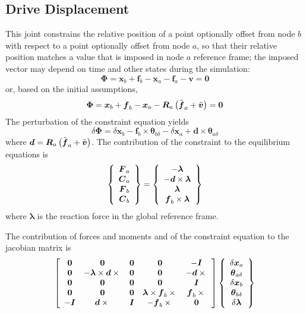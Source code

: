 \documentclass[10pt,dvips,fleqn]{report}
\newcommand{\T}[1]{\boldsymbol{#1}}
\begin{document}
\subsection{Drive Displacement}
This joint constrains the relative position of a point optionally offset 
from node $b$ with respect to a point optionally offset from node $a$, 
so that their relative position matches a value that is imposed in node $a$ 
reference frame; the imposed vector may depend on time and other states
during the simulation:
\begin{equation}
	\T{\Phi} = \T{x}_b + \T{f}_b - \T{x}_a - \T{f}_a - \T{v} = \T{0}
\end{equation}
or, based on the initial assumptions,
\begin{equation}
	\T{\Phi} = \T{x}_b + \T{f}_b - \T{x}_a
		- \T{R}_a\plbr{\tilde{\T{f}}_a + \tilde{\T{v}}} = \T{0}
\end{equation}
The perturbation of the constraint equation yields
\begin{equation}
	\delta\T{\Phi} = 
		\delta\T{x}_b
		- \T{f}_b\times\T{\theta}_{b\delta}
		- \delta\T{x}_a
		+ \T{d}\times\T{\theta}_{a\delta}
\end{equation}
where $\T{d}=\T{R}_a\plbr{\tilde{\T{f}}_a + \tilde{\T{v}}}$.
The contribution of the constraint to the equilibrium equations is
\begin{equation}
	\cubr{\cvvect{
		\T{F}_a \\
		\T{C}_a \\
		\T{F}_b \\
		\T{C}_b
	}} = \cubr{\cvvect{
		- \T{\lambda} \\
		- \T{d}\times\T{\lambda} \\
		\T{\lambda} \\
		\T{f}_b\times\T{\lambda}
	}}
\end{equation}
where $\T{\lambda}$ is the reaction force in the global reference frame.

The contribution of forces and moments and of the constraint equation 
to the jacobian matrix is
\begin{equation}
	\sqbr{\matr{ccccc}{
		\T{0} & \T{0} & \T{0} & \T{0} & - \T{I} \\
		\T{0} & - \T{\lambda}\times\T{d}\times{} & \T{0} & \T{0} & - \T{d}\times{}\\
		\T{0} & \T{0} & \T{0} & \T{0} & \T{I} \\
		\T{0} & \T{0} & \T{0} & \T{\lambda}\times\T{f}_b\times{} & \T{f}_b\times{} \\
		- \T{I} & \T{d}\times{} & \T{I} & - \T{f}_b\times{} & \T{0}
	}}\cubr{\cvvect{
		\delta\T{x}_a \\
		\T{\theta}_{a\delta} \\
		\delta\T{x}_b \\
		\T{\theta}_{b\delta} \\
		\delta\T{\lambda}
	}}
\end{equation}
\end{document}
